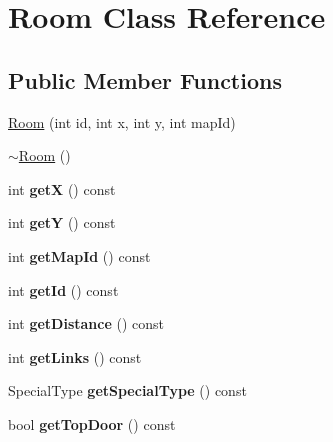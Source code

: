 \hypertarget{class_room}{\section{Room Class Reference}
\label{class_room}
}
\subsection*{Public Member Functions}
\begin{DoxyCompactItemize}
\item 
\hyperlink{class_room_aaef0b08fe3796290d4609470ddd9a0c4}{Room} (int id, int x, int y, int map\+Id)
\item 
\hyperlink{class_room_a67d5da09983cc53097807fd43ba5481a}{$\sim$\+Room} ()
\item 
\hypertarget{class_room_a067f0dbf1e1981f3f53692c454032bad}{int {\bfseries get\+X} () const }\label{class_room_a067f0dbf1e1981f3f53692c454032bad}

\item 
\hypertarget{class_room_a36707f281040aa8d27f13070b1a35b20}{int {\bfseries get\+Y} () const }\label{class_room_a36707f281040aa8d27f13070b1a35b20}

\item 
\hypertarget{class_room_ad36e96122696a31eec31a52ac99c4a4b}{int {\bfseries get\+Map\+Id} () const }\label{class_room_ad36e96122696a31eec31a52ac99c4a4b}

\item 
\hypertarget{class_room_a6f71af918166e1835662982219559d29}{int {\bfseries get\+Id} () const }\label{class_room_a6f71af918166e1835662982219559d29}

\item 
\hypertarget{class_room_a977bd80b8c374edb31eb467d191b7233}{int {\bfseries get\+Distance} () const }\label{class_room_a977bd80b8c374edb31eb467d191b7233}

\item 
\hypertarget{class_room_a63e8fe415cd7f3e7f327bf7603388638}{int {\bfseries get\+Links} () const }\label{class_room_a63e8fe415cd7f3e7f327bf7603388638}

\item 
\hypertarget{class_room_a97488664cbabc4cef3a63d18526b5fc0}{Special\+Type {\bfseries get\+Special\+Type} () const }\label{class_room_a97488664cbabc4cef3a63d18526b5fc0}

\item 
\hypertarget{class_room_ad490b94e5406c002c875b4a507674008}{bool {\bfseries get\+Top\+Door} () const }\label{class_room_ad490b94e5406c002c875b4a507674008}


\end{DoxyCompactItemize}
